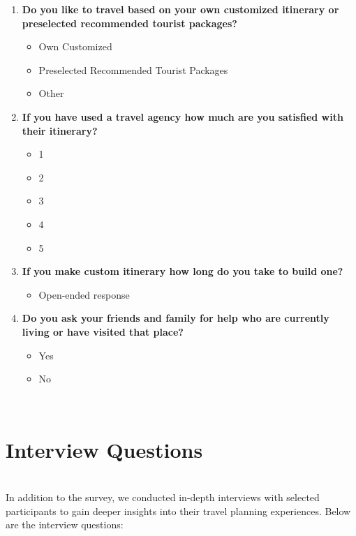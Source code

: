 \documentclass[conference]{IEEEtran}
\begin{document}
\begin{enumerate}
        \item \textbf{Do you like to travel based on your own customized itinerary or preselected recommended tourist packages?}
        \begin{itemize}
            \item Own Customized
            \item Preselected Recommended Tourist Packages
            \item Other
        \end{itemize}

        \item \textbf{If you have used a travel agency how much are you satisfied with their itinerary?}
        \begin{itemize}
            \item 1
            \item 2
            \item 3
            \item 4
            \item 5
        \end{itemize}

        \item \textbf{If you make custom itinerary how long do you take to build one?}
        \begin{itemize}
            \item Open-ended response
        \end{itemize}

        \item \textbf{Do you ask your friends and family for help who are currently living or have visited that place?}
        \begin{itemize}
            \item Yes
            \item No
        \end{itemize}
    \end{enumerate}
    \\


\section{Interview Questions}
\\
    In addition to the survey, we conducted in-depth interviews with selected participants to gain deeper insights into their travel planning experiences. Below are the interview questions:
    \\
\end{document}
